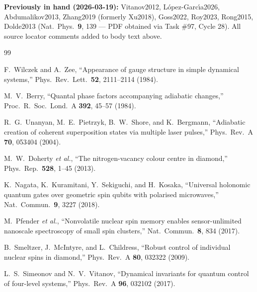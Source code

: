 \documentclass[11pt,letterpaper]{article}
\begin{document}
\noindent \textbf{Previously in hand (2026-03-19):} Vitanov2012, L\'{o}pez-Garc\'{\i}a2026, Abdumalikov2013, Zhang2019 (formerly Xu2018), Goss2022, Roy2023, Rong2015, Dolde2013 (Nat.\ Phys.\ \textbf{9}, 139 --- PDF obtained via Task \#97, Cycle 28).
All source locator comments added to body text above.



\begin{thebibliography}{99}


F.~Wilczek and A.~Zee,
``Appearance of gauge structure in simple dynamical systems,''
Phys.\ Rev.\ Lett.\ \textbf{52}, 2111--2114 (1984).

M.~V.~Berry,
``Quantal phase factors accompanying adiabatic changes,''
Proc.\ R.\ Soc.\ Lond.\ A \textbf{392}, 45--57 (1984).

R.~G.~Unanyan, M.~E.~Pietrzyk, B.~W.~Shore, and K.~Bergmann,
``Adiabatic creation of coherent superposition states via multiple laser pulses,''
Phys.\ Rev.\ A \textbf{70}, 053404 (2004).

M.~W.~Doherty \textit{et al.},
``The nitrogen-vacancy colour centre in diamond,''
Phys.\ Rep.\ \textbf{528}, 1--45 (2013).

K.~Nagata, K.~Kuramitani, Y.~Sekiguchi, and H.~Kosaka,
``Universal holonomic quantum gates over geometric spin qubits with polarised microwaves,''
Nat.\ Commun.\ \textbf{9}, 3227 (2018).

M.~Pfender \textit{et al.},
``Nonvolatile nuclear spin memory enables sensor-unlimited nanoscale spectroscopy of small spin clusters,''
Nat.\ Commun.\ \textbf{8}, 834 (2017).

B.~Smeltzer, J.~McIntyre, and L.~Childress,
``Robust control of individual nuclear spins in diamond,''
Phys.\ Rev.\ A \textbf{80}, 032322 (2009).

L.~S.~Simeonov and N.~V.~Vitanov,
``Dynamical invariants for quantum control of four-level systems,''
Phys.\ Rev.\ A \textbf{96}, 032102 (2017).


\end{thebibliography}
\end{document}
